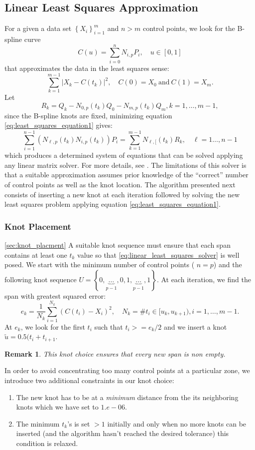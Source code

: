 \documentclass[a4paper,10pt]{article}
\newtheorem{remark}{Remark}[section]
\begin{document}
\subsection{Linear Least Squares Approximation}
For a given a data set $\left\{X_i\right\}_{i=1}^m$ and $n>m$ control points, we look for the B-spline curve 
\begin{equation}
 C(u) = \sum_{i=0}^n N_{i,p} P_i,\quad u\in[0,1]
\end{equation}\label{eq:least_squares_equation1}
that approximates the data in the least squares sense:
$$
\sum _{k= 1}^{m-1}\left | X_k - C(t_k)\right|^2,\quad C(0)= X_0\ \text {and}\  C(1) = X_m.
$$
Let 
$$
 R_k = Q_k - N_{0,p}(t_k)Q_0 - N_{m,p}(t_k)Q_m,  k = 1,\ldots, m-1, 
$$
since the B-spline knots are fixed, minimizing equation \eqref{eq:least_squares_equation1} gives:
\begin{equation}\label{eq:linear_least_squares_solver}
 \sum_{i=1}^{n-1} \left(N_{\ell, p}(t_k)N_{i,p}(t_k)\right)P_i= \sum_{k=1}^{m-1}N_{\ell,[}(t_k)R_k, \quad \ell= 1\ldots, n-1
\end{equation}
 which produces a determined system of equations that can be solved applying any linear matrix solver. For more details, see \cite{nurbs_book}.
The limitations of this solver is that a suitable approximation assumes prior knowledge of the ``correct'' number of control points as well as the knot 
location. The algorithm presented next consists of inserting a new knot at 
each iteration followed by solving the new least squares problem applying equation \eqref{eq:least_squares_equation1}. 

\subsubsection{Knot Placement}\ref{sec:knot_placment}
A suitable knot sequence must ensure that each span contains at least one $t_k$ value so that \eqref{eq:linear_least_squares_solver} is well posed. 
We start with the minimum number of control points ( $n = p$) and the following knot sequence 
$U=\left\{0,\underbrace{\ldots}_{p-1},0,1,\underbrace{\ldots}_{p-1},1\right\}$. 
 At each iteration, we find the span with greatest squared error: 
 $$e_k = \frac{1}{N_k}\sum_{i=1}^{N_k} (C(t_i) - X_i)^2,\quad N_k = \# t_i\in [u_k, u_{k+1}), i=1,\ldots,m-1.$$
 At $e_k$, we look for the first $t_i$ such that $t_i >= e_k/2$ and we insert a knot $\tilde u = 0.5(t_i+t_{i+1}$. 
 \begin{remark}
  This knot choice ensures that every new span is non empty. 
 \end{remark}
In order to avoid concentrating too many control points at a particular zone, we introduce two additional 
constraints in our knot choice:
\begin{enumerate}
 \item The new knot has to be at a \emph{minimum} distance from the its neighboring knots which we have set to $1.e-06$. 
 \item The minimum $t_k$'s is set $>1$ initially and only when no more knots can be inserted (and the algorithm hasn't reached the desired tolerance) this condition is relaxed. 
\end{enumerate}
\end{document}
